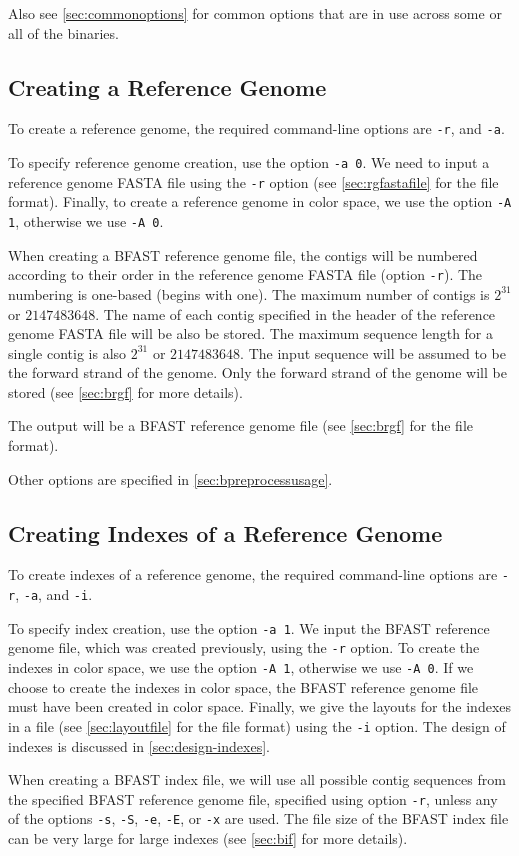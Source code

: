 \documentclass[a4paper,12pt]{book}
\newcommand{\TT}[1]{{\tt #1}} %
\newcommand{\rGFF}{reference genome FASTA file}
\newcommand{\BRGF}{BFAST reference genome file} %
\newcommand{\BIF}{BFAST index file} %
\begin{document}
Also see \autoref{sec:commonoptions} for common options that are in use across some or all of the binaries.
\subsection{Creating a Reference Genome}
\label{sec:creating-a-rg}
To create a reference genome, the required command-line options are \TT{-r}, and \TT{-a}.

To specify reference genome creation, use the option \TT{-a 0}.
We need to input a \rGFF{} using the \TT{-r} option (see \autoref{sec:rgfastafile} for the file format).
Finally, to create a reference genome in color space, we use the option \TT{-A 1}, otherwise we use \TT{-A 0}.

When creating a \BRGF{}, the contigs will be numbered according to their order in the \rGFF{} (option \TT{-r}).
The numbering is one-based (begins with one).
The maximum number of contigs is $2^{31}$ or $2147483648$.
The name of each contig specified in the header of the \rGFF{} will be also be stored.
The maximum sequence length for a single contig is also $2^{31}$ or $2147483648$. 
The input sequence will be assumed to be the forward strand of the genome.
Only the forward strand of the genome will be stored (see \autoref{sec:brgf} for more details).

The output will be a \BRGF{} (see \autoref{sec:brgf} for the file format).

Other options are specified in \autoref{sec:bpreprocessusage}.
\subsection{Creating Indexes of a Reference Genome}
\label{sec:creating-bifs}
To create indexes of a reference genome, the required command-line options are \TT{-r}, \TT{-a}, and \TT{-i}.

To specify index creation, use the option \TT{-a 1}.
We input the \BRGF{}, which was created previously, using the \TT{-r} option.
To create the indexes in color space, we use the option \TT{-A 1}, otherwise we use \TT{-A 0}.
If we choose to create the indexes in color space, the \BRGF{} must have been created in color space.
Finally, we give the layouts for the indexes in a file (see \autoref{sec:layoutfile} for the file format) using the \TT{-i} option.
The design of indexes is discussed in \autoref{sec:design-indexes}.

When creating a \BIF{}, we will use all possible contig sequences from the specified \BRGF{}, specified using option \TT{-r}, unless any of the options \TT{-s}, \TT{-S}, \TT{-e}, \TT{-E}, or \TT{-x} are used.
The file size of the \BIF{} can be very large for large indexes (see \autoref{sec:bif} for more details).
\end{document}
